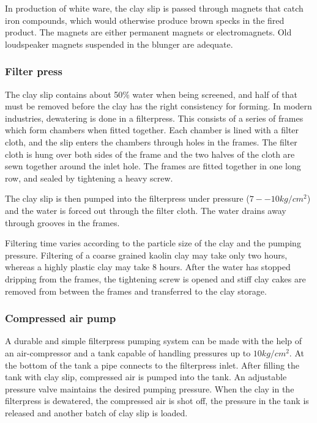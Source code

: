 In production of white ware, the clay slip is passed through magnets that catch 
iron compounds, which would otherwise produce brown specks in the fired 
product. The magnets are either permanent magnets or electromagnets. Old 
loudspeaker magnets suspended in the blunger are adequate.
\subsubsection{Filter press}
The clay slip contains about 50\% water when being screened, and half of that 
must be removed before the clay has the right consistency for forming. In 
modern industries, dewatering is done in a filterpress. This consists of a 
series of frames which form chambers when fitted together. Each chamber is 
lined with a filter cloth, and the slip enters the chambers through holes in 
the frames. The filter cloth is hung over both sides of the frame and the two 
halves of the cloth are sewn together around the inlet hole. The frames are 
fitted together in one long row, and sealed by tightening a heavy screw.

The clay slip is then pumped into the filterpress under pressure ($7--10 
kg/cm^2$) and the water is forced out through the filter cloth. The water 
drains away through grooves in the frames.

Filtering time varies according to the particle size of the clay and the 
pumping pressure. Filtering of a coarse grained kaolin clay may take only two 
hours, whereas a highly plastic clay may take 8 hours. After the water has 
stopped dripping from the frames, the tightening screw is opened and stiff clay 
cakes are removed from between the frames and transferred to the clay storage.
\subsubsection{Compressed air pump}

A durable and simple filterpress pumping system can be made with the help of an 
air-compressor and a tank capable of handling pressures up to $10 kg/cm^2$. At 
the bottom of the tank a pipe connects to the filterpress inlet. After filling 
the tank with clay slip, compressed air is pumped into the tank. An adjustable 
pressure valve maintains the desired pumping pressure. When the clay in the 
filterpress is dewatered, the compressed air is shot off, the pressure in the 
tank is released and another batch of clay slip is loaded.

